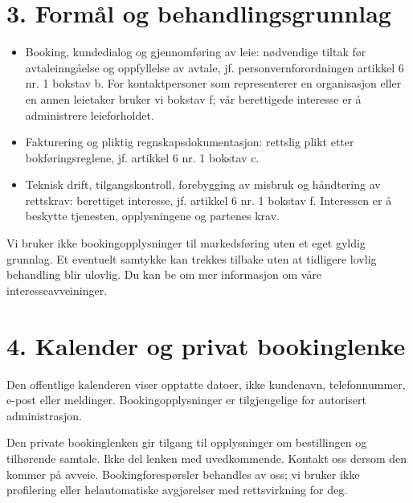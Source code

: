 \documentclass[12pt,a4paper]{article}
\begin{document}
\section{3. Formål og behandlingsgrunnlag}
\begin{itemize}
\item Booking, kundedialog og gjennomføring av leie: nødvendige tiltak før avtaleinngåelse og oppfyllelse av avtale, jf. personvernforordningen artikkel 6 nr. 1 bokstav b. For kontaktpersoner som representerer en organisasjon eller en annen leietaker bruker vi bokstav f; vår berettigede interesse er å administrere leieforholdet.
\item Fakturering og pliktig regnskapsdokumentasjon: rettslig plikt etter bokføringsreglene, jf. artikkel 6 nr. 1 bokstav c.
\item Teknisk drift, tilgangskontroll, forebygging av misbruk og håndtering av rettskrav: berettiget interesse, jf. artikkel 6 nr. 1 bokstav f. Interessen er å beskytte tjenesten, opplysningene og partenes krav.
\end{itemize}
Vi bruker ikke bookingopplysninger til markedsføring uten et eget gyldig grunnlag. Et eventuelt samtykke kan trekkes tilbake uten at tidligere lovlig behandling blir ulovlig. Du kan be om mer informasjon om våre interesseavveininger.


\section{4. Kalender og privat bookinglenke}
Den offentlige kalenderen viser opptatte datoer, ikke kundenavn, telefonnummer, e-post eller meldinger. Bookingopplysninger er tilgjengelige for autorisert administrasjon.

Den private bookinglenken gir tilgang til opplysninger om bestillingen og tilhørende samtale. Ikke del lenken med uvedkommende. Kontakt oss dersom den kommer på avveie. Bookingforespørsler behandles av oss; vi bruker ikke profilering eller helautomatiske avgjørelser med rettsvirkning for deg.
\end{document}
